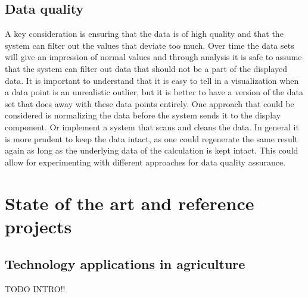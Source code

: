 \documentclass[]{uiophd}
\begin{document}
\section{Data quality}
A key consideration is ensuring that the data is of high quality and that the system can filter out the values that deviate too much. Over time the data sets will give an impression of normal values and through analysis it is safe to assume that the system can filter out data that should not be a part of the displayed data. It is important to understand that it is easy to tell in a visualization when a data point is an unrealistic outlier, but it is better to have a version of the data set that does away with these data points entirely. One approach that could be considered is normalizing the data before the system sends it to the display component. Or implement a system that scans and cleans the data. In general it is more prudent to keep the data intact, as one could regenerate the same result again as long as the underlying data of the calculation is kept intact. This could allow for experimenting with different approaches for data quality assurance.

\chapter{State of the art and reference projects}

\section{Technology applications in agriculture}
TODO INTRO!!
\end{document}
